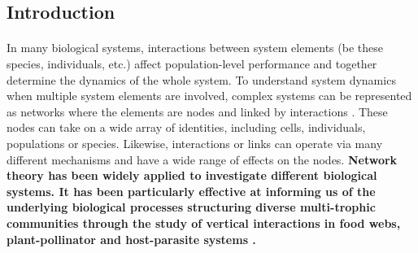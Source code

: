 \documentclass[a4,12pt]{article}
\begin{document}
\begin{refsection}

\section{Introduction}

    
    \paragraph{}
    In many biological systems, interactions between system elements (be these species, individuals, etc.) affect population-level performance and together determine the dynamics of the whole system. To understand system dynamics when multiple system elements are involved, complex systems can be represented as networks where the elements are nodes and linked by interactions \parencite{Pimm1978}. These nodes can take on a wide array of identities, including cells, individuals, populations or species. Likewise, interactions or links can operate via many different mechanisms and have a wide range of effects on the nodes. \textbf{Network theory has been widely applied to investigate different biological systems. It has been particularly effective at informing us of the underlying biological processes structuring diverse multi-trophic communities \parencite{Dunne2002, Thompson2012} through the study of vertical interactions in food webs, plant-pollinator and host-parasite systems \parencite{Lafferty2008, Stouffer2014, Cirtwill2015a}.}


\end{refsection}
\end{document}
